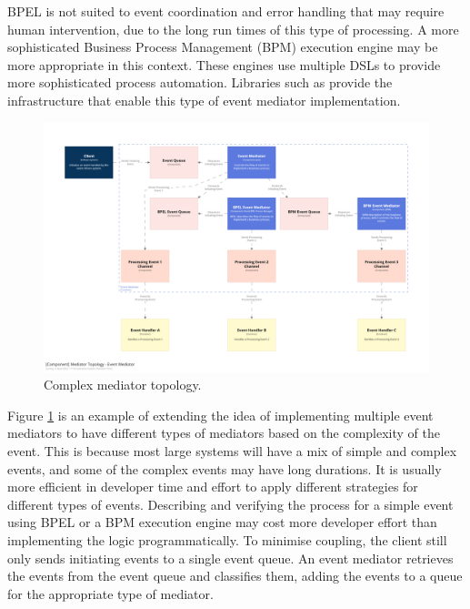 BPEL is not suited to event coordination and error handling that may require human intervention, due to the long run times of this type of processing.
A more sophisticated Business Process Management (BPM) execution engine may be more appropriate in this context.
These engines use multiple DSLs to provide more sophisticated process automation.
Libraries such as  provide the infrastructure that enable this type of event mediator implementation.

\begin{figure}[h!]
    \begin{adjustwidth}{-10mm}{-10mm}
        \centering
        \includegraphics[trim=195 195 195 195,clip,width=0.97\paperwidth]{diagrams/complex-mediator-components.png}
    \end{adjustwidth}
    \caption{Complex mediator topology.}
    \label{fig:complex-mediator-components}
\end{figure}

Figure \ref{fig:complex-mediator-components} is an example of extending the idea of implementing multiple event mediators
to have different types of mediators based on the complexity of the event.
This is because most large systems will have a mix of simple and complex events, and some of the complex events may have long durations.
It is usually more efficient in developer time and effort to apply different strategies for different types of events.
Describing and verifying the process for a simple event using BPEL or a BPM execution engine
may cost more developer effort than implementing the logic programmatically.
To minimise coupling, the client still only sends initiating events to a single event queue.
An event mediator retrieves the events from the event queue and classifies them,
adding the events to a queue for the appropriate type of mediator.


